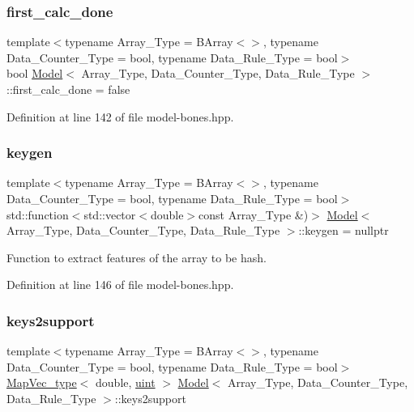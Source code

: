 \subsubsection{\texorpdfstring{first\+\_\+calc\+\_\+done}{first\_calc\_done}}
{\footnotesize\ttfamily template$<$typename Array\+\_\+\+Type  = B\+Array$<$$>$, typename Data\+\_\+\+Counter\+\_\+\+Type  = bool, typename Data\+\_\+\+Rule\+\_\+\+Type  = bool$>$ \\
bool \hyperlink{class_model}{Model}$<$ Array\+\_\+\+Type, Data\+\_\+\+Counter\+\_\+\+Type, Data\+\_\+\+Rule\+\_\+\+Type $>$\+::first\+\_\+calc\+\_\+done = false}



Definition at line 142 of file model-\/bones.\+hpp.

\mbox{\label{class_model_a16561e15c0abbb080927382b30d43e35}} 
\subsubsection{\texorpdfstring{keygen}{keygen}}
{\footnotesize\ttfamily template$<$typename Array\+\_\+\+Type  = B\+Array$<$$>$, typename Data\+\_\+\+Counter\+\_\+\+Type  = bool, typename Data\+\_\+\+Rule\+\_\+\+Type  = bool$>$ \\
std\+::function$<$std\+::vector$<$double$>$const Array\+\_\+\+Type \&)$>$ \hyperlink{class_model}{Model}$<$ Array\+\_\+\+Type, Data\+\_\+\+Counter\+\_\+\+Type, Data\+\_\+\+Rule\+\_\+\+Type $>$\+::keygen = nullptr}



Function to extract features of the array to be hash. 



Definition at line 146 of file model-\/bones.\+hpp.

\mbox{\label{class_model_a2a81190ac618b04479686411d02b3c5f}} 
\subsubsection{\texorpdfstring{keys2support}{keys2support}}
{\footnotesize\ttfamily template$<$typename Array\+\_\+\+Type  = B\+Array$<$$>$, typename Data\+\_\+\+Counter\+\_\+\+Type  = bool, typename Data\+\_\+\+Rule\+\_\+\+Type  = bool$>$ \\
\hyperlink{typedefs_8hpp_a02ed8dec96bc528c8bc3d8cb3c4674a5}{Map\+Vec\+\_\+type}$<$ double, \hyperlink{typedefs_8hpp_a91ad9478d81a7aaf2593e8d9c3d06a14}{uint} $>$ \hyperlink{class_model}{Model}$<$ Array\+\_\+\+Type, Data\+\_\+\+Counter\+\_\+\+Type, Data\+\_\+\+Rule\+\_\+\+Type $>$\+::keys2support}



